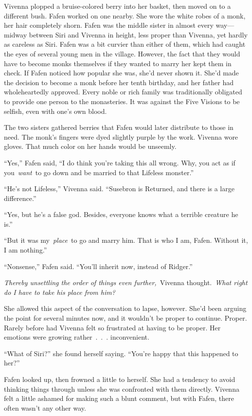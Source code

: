 Vivenna plopped a bruise-colored berry into her basket, then moved on to a different bush. Fafen worked on one nearby. She wore the white robes of a monk, her hair completely shorn. Fafen was the middle sister in almost every way—midway between Siri and Vivenna in height, less proper than Vivenna, yet hardly as careless as Siri. Fafen was a bit curvier than either of them, which had caught the eyes of several young men in the village. However, the fact that they would have to become monks themselves if they wanted to marry her kept them in check. If Fafen noticed how popular she was, she’d never shown it. She’d made the decision to become a monk before her tenth birthday, and her father had wholeheartedly approved. Every noble or rich family was traditionally obligated to provide one person to the monasteries. It was against the Five Visions to be selfish, even with one’s own blood.

The two sisters gathered berries that Fafen would later distribute to those in need. The monk’s fingers were dyed slightly purple by the work. Vivenna wore gloves. That much color on her hands would be unseemly.

“Yes,” Fafen said, “I do think you’re taking this all wrong. Why, you act as if you~\textit{want}~to go down and be married to that Lifeless monster.”

“He’s not Lifeless,” Vivenna said. “Susebron is Returned, and there is a large difference.”

“Yes, but he’s a false god. Besides, everyone knows what a terrible creature he is.”

“But it was my~\textit{place}~to go and marry him. That is who I am, Fafen. Without it, I am nothing.”

“Nonsense,” Fafen said. “You’ll inherit now, instead of Ridger.”

\textit{Thereby unsettling the order of things even further,}~Vivenna thought.~\textit{What right do I have to take his place from him?}

She allowed this aspect of the conversation to lapse, however. She’d been arguing the point for several minutes now, and it wouldn’t be proper to continue. Proper. Rarely before had Vivenna felt so frustrated at having to be proper. Her emotions were growing rather~.~.~. inconvenient.

“What of Siri?” she found herself saying. “You’re happy that this happened to her?”

Fafen looked up, then frowned a little to herself. She had a tendency to avoid thinking things through unless she was confronted with them directly. Vivenna felt a little ashamed for making such a blunt comment, but with Fafen, there often wasn’t any other way.

